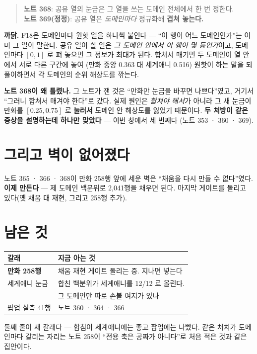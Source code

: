 \documentclass[11pt]{article}
\begin{document}
\begin{quote}
\textbf{노트 368}: 공유 열의 눈금은 그 열을 쓰는 도메인 전체에서 한 번
정한다. \\
\textbf{노트 369(정정)}: 공유 열은 \emph{도메인마다} 정규화해
\textbf{겹쳐 놓는다.}
\end{quote}

\textbf{까닭.} F18은 도메인마다 원핫 열을 하나씩 붙인다 --- ``이 행이 어느
도메인인가''는 이미 그 열이 말한다. 공유 열이 할 일은 \emph{그 도메인
안에서 이 행이 몇 등인가}이고, 도메인마다 $[0,1]$ 로 펴 놓으면 그 정보가
최대가 된다. 합쳐서 매기면 두 도메인이 열 안에서 서로 다른 구간에 놓여
(만화 중앙 0.363 대 세계애니 0.516) 원핫이 하는 말을 되풀이하면서
각 도메인의 순위 해상도를 깎는다.

\textbf{노트 368이 왜 틀렸나.} 그 노트가 잰 것은 ``만화만 눈금을 바꾸면
나쁘다''였고, 거기서 ``그러니 합쳐서 매겨야 한다''로 갔다. 실제 원인은
\emph{합쳐야 해서}가 아니라 그 새 눈금이 만화를 $[0.25,0.75]$ 로
\textbf{눌러서} 도메인 안 해상도를 잃었기 때문이다. \textbf{두 처방이
같은 증상을 설명하는데 하나만 맞았다} --- 이번 창에서 세 번째다
(노트 353 · 360 · 369).

\section{그리고 벽이 없어졌다}

노트 365 · 366 · 368이 만화 258행 앞에 세운 벽은 ``채움을 다시 만들 수
없다''였다. \textbf{이제 만든다} --- 제 도메인 백분위로 2,041행을 채우면
된다. 마지막 게이트를 돌리고 있다(옛 채움 대 재현, 그리고 258행 추가).

\section{남은 것}

\begin{center}
\begin{tabular}{ll}
\hline
갈래 & 지금 아는 것 \\
\hline
\textbf{만화 258행} & 채움 재현 게이트 돌리는 중. 지나면 넣는다 \\
세계애니 눈금 & 합친 백분위가 세계애니를 12/12 로 올린다. \\
 & 그 도메인만 따로 손볼 여지가 있나 \\
팝업 실측 41행 & 노트 360 · 364 · 366 \\
\hline
\end{tabular}
\end{center}

둘째 줄이 새 갈래다 --- 합침이 세계애니에는 좋고 팝업에는 나빴다.
같은 처치가 도메인마다 갈리는 자리는 노트 258이 ``전용 축은 공짜가
아니다''로 처음 적은 것과 같은 집안이다.
\end{document}
